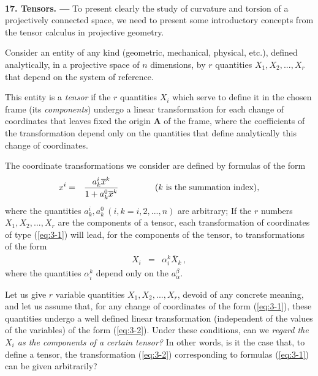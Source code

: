 
\ \\

{\bf 17. Tensors. --- }
% 
To present clearly the study of curvature and torsion of a projectively connected space, we need to present some introductory concepts from the tensor calculus in projective geometry.

Consider an entity of any kind (geometric, mechanical, physical, etc.), defined analytically, in a projective space of $n$ dimensions, by $r$ quantities $X_1, X_2,..., X_r$ that depend on the system of reference.

This entity is a {\em tensor} if the $r$ quantities $X_i$ which serve to define it in the chosen frame (its {\em components}) undergo a linear transformation for each change of coordinates that leaves fixed the origin $\bm A$ of the frame, where the coefficients of the transformation depend only on the quantities that define analytically this change of coordinates.

The coordinate transformations we consider are defined by formulas of the form
\begin{eqnarray}
x^i &=& \frac{a^i_k \overline x^k}{1 + a^0_k \overline x^k} \hspace*{1.5cm}
\mbox{($k$ is the summation index),}
\label{eq:3-1}
\end{eqnarray}
where the quantities $a^i_k, a^0_k\ (i, k = i, 2, ..., n)$ are arbitrary; If the $r$ numbers $X_1, X_2,..., X_r$ are the components of a tensor, each transformation of coordinates of type (\ref{eq:3-1}) will lead, for the components of the tensor, to transformations of the form 
\begin{eqnarray}
X_i &=& \alpha^k_i \overline X_k\, ,
\label{eq:3-2}
\end{eqnarray}
where the quantities $\alpha^k_i$ depend only on the $a^\beta_\alpha$.

Let us give $r$ variable quantities $X_1, X_2, ..., X_r$, devoid of any concrete meaning, and let us assume that, for any change of coordinates of the form (\ref{eq:3-1}),  these quantities undergo a well defined linear transformation (independent of the values of the variables) of the form (\ref{eq:3-2}). Under these conditions, can we {\em regard the $X_i$ as the components of a certain tensor?} In other words, is it the case that, to define a tensor, the transformation (\ref{eq:3-2}) corresponding to formulas (\ref{eq:3-1}) can be given arbitrarily?

